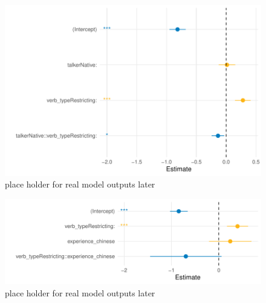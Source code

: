 



\begin{figure}[h]
    \centering
    \includegraphics[width=\textwidth]{figures/GLMER_base_model.pdf}
    \caption{place holder for real model outputs later}
    \label{fig:model_outputs}
\end{figure}

\begin{figure}[h]
    \centering
    \includegraphics[width=\textwidth]{figures/GLMER_accent_model.pdf}
    \caption{place holder for real model outputs later}
    \label{fig:model_outputs}
\end{figure}

